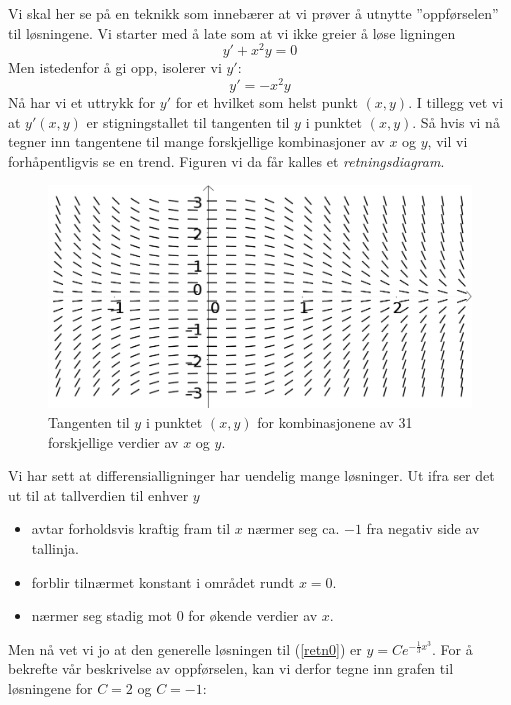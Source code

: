Vi skal her se på en teknikk som innebærer at vi prøver å utnytte ''oppførselen'' til løsningene. Vi starter med å late som at vi ikke greier å løse ligningen
\begin{equation}
y'+x^2 y = 0 \label{retn0}
\end{equation}
Men istedenfor å gi opp, isolerer vi $ y' $:
\[ y'= -x^2 y \]
Nå har vi et uttrykk for $ y' $ for et hvilket som helst punkt $ (x, y) $. I tillegg vet vi at $ y'(x,y) $ er stigningstallet til tangenten til $ y $ i punktet $ (x, y) $. Så hvis vi nå tegner inn tangentene til mange forskjellige kombinasjoner av $ x $ og $ y $, vil vi forhåpentligvis se en trend. Figuren vi da får kalles et \textit{retningsdiagram}.
\begin{figure}
		\centering
	\includegraphics[scale=1]{retn}
	\caption{Tangenten til $ y $ i punktet $ (x, y) $ for kombinasjonene av 31 forskjellige verdier av $ x $ og $ y $. \label{retn}}
\end{figure}
Vi har sett at differensialligninger har uendelig mange løsninger. Ut ifra  ser det ut til at tallverdien til enhver $ y $
\begin{itemize}
	\item avtar forholdsvis kraftig fram til $ x $ nærmer seg ca. $ -1 $ fra negativ side av tallinja.
	\item forblir tilnærmet konstant i området rundt $ x=0 $.
	\item nærmer seg stadig mot 0 for økende verdier av $ x $.
\end{itemize}
Men nå vet vi jo at den generelle løsningen til (\ref{retn0}) er $ y=Ce^{-\frac{1}{3}x^3} $. For å bekrefte vår beskrivelse av oppførselen, kan vi derfor tegne inn grafen til løsningene for $ {C=2} $ og $ {C=-1} $:
\newpage
